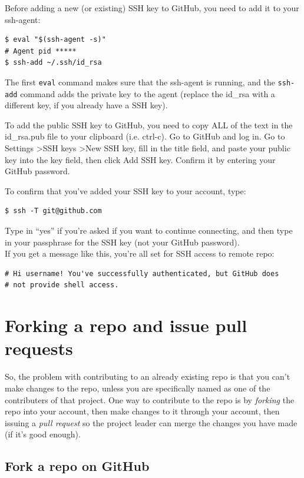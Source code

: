 \documentclass[a4paper, 12pt]{article}
\begin{document}
Before adding a new (or existing) SSH key to GitHub, you need to add it to your ssh-agent:
\begin{lstlisting}
$ eval "$(ssh-agent -s)"
# Agent pid *****
$ ssh-add ~/.ssh/id_rsa
\end{lstlisting}
The first \verb|eval| command makes sure that the ssh-agent is running, and the \verb|ssh-add| command adds the private key to the agent (replace the id\_rsa with a different key, if you already have a SSH key).

To add the public SSH key to GitHub, you need to copy ALL of the text in the id\_rsa.pub file to your clipboard (i.e. ctrl-c).
Go to GitHub and log in.
Go to Settings \textgreater SSH keys \textgreater New SSH key, fill in the title field, and paste your public key into the key field, then click Add SSH key.
Confirm it by entering your GitHub password.

To confirm that you've added your SSH key to your account, type:
\begin{lstlisting}
$ ssh -T git@github.com
\end{lstlisting}
Type in ``yes'' if you're asked if you want to continue connecting, and then type in your passphrase for the SSH key (not your GitHub password).\\
If you get a message like this, you're all set for SSH access to remote repo:
\begin{lstlisting}
# Hi username! You've successfully authenticated, but GitHub does
# not provide shell access.
\end{lstlisting}

\section*{Forking a repo and issue pull requests}

So, the problem with contributing to an already existing repo is that you can't make changes to the repo, unless you are specifically named as one of the contributers of that project.
One way to contribute to the repo is by {\itshape forking} the repo into your account, then make changes to it through your account, then issuing a {\itshape pull request} so the project leader can merge the changes you have made (if it's good enough).

\subsection*{Fork a repo on GitHub}
\end{document}
